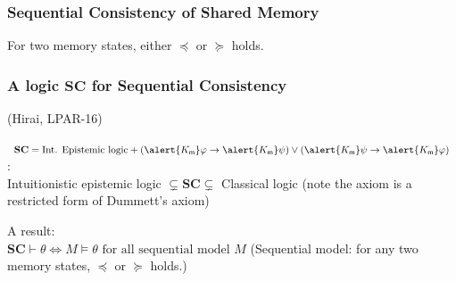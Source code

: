 \documentclass[slidestop,compress,mathserif]{beamer}
\begin{document}
\begin{frame}
 \frametitle{Sequential Consistency of Shared Memory}

For two memory states, either $\preceq$ or $\succeq$ holds.
\vfill

\end{frame}

\begin{frame}
 \frametitle{A logic $\mathbf{SC}$ for Sequential Consistency}
   (Hirai, LPAR-16)

 $\mathbf{SC} = \text{Int. {Epistemic} logic}
 + (\alert{K_\memory}\varphi\rightarrow \alert{K_\memory}\psi)\vee
 (\alert{K_\memory}\psi\rightarrow \alert{K_\memory}\varphi)$:\\
 \hskip 2cm Intuitionistic epistemic logic $\subsetneq \mathbf{SC}
 \subsetneq $ Classical logic
 \vfill
 (note the axiom is a restricted form of Dummett's axiom)

 \vfill
A result:\\
\hskip 2cm $\mathbf{SC}
 \vdash \theta \Longleftrightarrow M\models \theta \text{ for all sequential model }M$
 \vfill
 (Sequential model: for any two \alert{memory states}, $\preceq$ or $\succeq$ holds.)
\end{frame}
\end{document}
